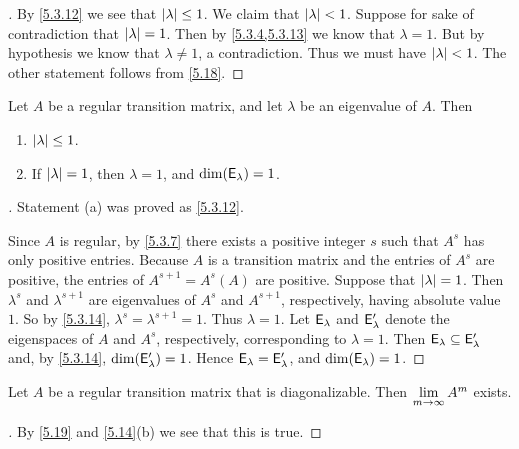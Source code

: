 \begin{proof}[]
  By \cref{5.3.12} we see that \(\left\lvert\lambda\right\rvert \leq 1\).
  We claim that \(\left\lvert\lambda\right\rvert < 1\).
  Suppose for sake of contradiction that \(\left\lvert\lambda\right\rvert = 1\).
  Then by \cref{5.3.4,5.3.13} we know that \(\lambda = 1\).
  But by hypothesis we know that \(\lambda \neq 1\), a contradiction.
  Thus we must have \(\left\lvert\lambda\right\rvert < 1\).
  The other statement follows from \cref{5.18}.
\end{proof}

\begin{thm}\label{5.19}
  Let \(A\) be a regular transition matrix, and let \(\lambda\) be an eigenvalue of \(A\).
  Then
  \begin{enumerate}
    \item \(\left\lvert\lambda\right\rvert \leq 1\).
    \item If \(\left\lvert\lambda\right\rvert = 1\), then \(\lambda = 1\), and \(\dim(\mathsf{E}_{\lambda}) = 1\).
  \end{enumerate}
\end{thm}

\begin{proof}[]
  Statement (a) was proved as \cref{5.3.12}.

  Since \(A\) is regular, by \cref{5.3.7} there exists a positive integer \(s\) such that \(A^s\) has only positive entries.
  Because \(A\) is a transition matrix and the entries of \(A^s\) are positive, the entries of \(A^{s + 1} = A^s (A)\) are positive.
  Suppose that \(\left\lvert\lambda\right\rvert = 1\).
  Then \(\lambda^s\) and \(\lambda^{s + 1}\) are eigenvalues of \(A^s\) and \(A^{s + 1}\), respectively, having absolute value \(1\).
  So by \cref{5.3.14}, \(\lambda^s = \lambda^{s + 1} = 1\).
  Thus \(\lambda = 1\).
  Let \(\mathsf{E}_{\lambda}\) and \(\mathsf{E}_{\lambda}'\) denote the eigenspaces of \(A\) and \(A^s\), respectively, corresponding to \(\lambda = 1\).
  Then \(\mathsf{E}_{\lambda} \subseteq \mathsf{E}_{\lambda}'\) and, by \cref{5.3.14}, \(\dim(\mathsf{E}_{\lambda}') = 1\).
  Hence \(\mathsf{E}_{\lambda} = \mathsf{E}_{\lambda}'\), and \(\dim(\mathsf{E}_{\lambda}) = 1\).
\end{proof}

\begin{cor}\label{5.3.15}
  Let \(A\) be a regular transition matrix that is diagonalizable.
  Then \(\lim\limits_{m \to \infty} A^m\) exists.
\end{cor}

\begin{proof}[]
  By \cref{5.19} and \cref{5.14}(b) we see that this is true.
\end{proof}

